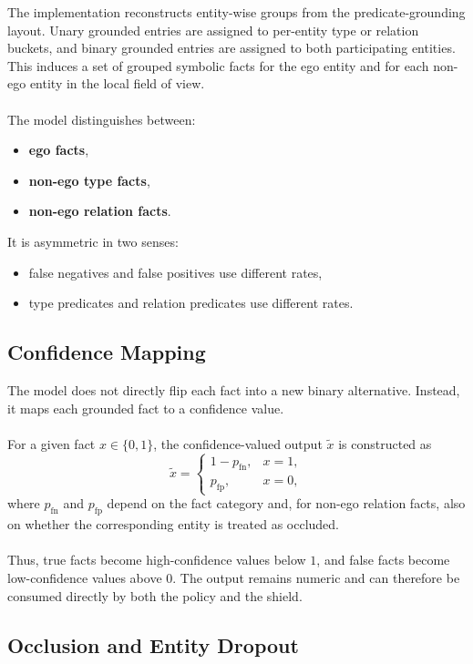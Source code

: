 The implementation reconstructs entity-wise groups from the predicate-grounding layout. Unary grounded entries are assigned to per-entity type or relation buckets, and binary grounded entries are assigned to both participating entities. This induces a set of grouped symbolic facts for the ego entity and for each non-ego entity in the local field of view.
\\
\\
The model distinguishes between:
\begin{itemize}
    \item \textbf{ego facts},
    \item \textbf{non-ego type facts},
    \item \textbf{non-ego relation facts}.
\end{itemize}

\noindent It is asymmetric in two senses:
\begin{itemize}
    \item false negatives and false positives use different rates,
    \item type predicates and relation predicates use different rates.
\end{itemize}

\subsection{Confidence Mapping}

The model does not directly flip each fact into a new binary alternative. Instead, it maps each grounded fact to a confidence value.
\\
\\
For a given fact \(x \in \{0,1\}\), the confidence-valued output \(\tilde{x}\) is constructed as
\[
\tilde{x} =
\begin{cases}
1 - p_{\mathrm{fn}}, & x = 1,\\
p_{\mathrm{fp}}, & x = 0,
\end{cases}
\]
where \(p_{\mathrm{fn}}\) and \(p_{\mathrm{fp}}\) depend on the fact category and, for non-ego relation facts, also on whether the corresponding entity is treated as occluded.
\\
\\
Thus, true facts become high-confidence values below \(1\), and false facts become low-confidence values above \(0\). The output remains numeric and can therefore be consumed directly by both the policy and the shield.

\subsection{Occlusion and Entity Dropout}

